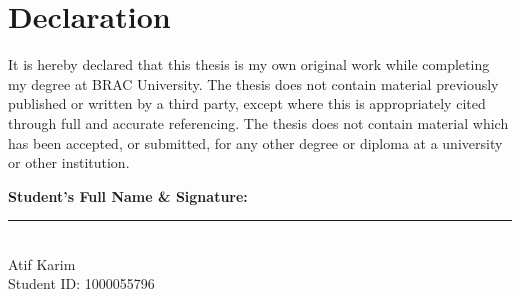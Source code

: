 \chapter*{Declaration}

It is hereby declared that this thesis is my own original work while
completing my degree at BRAC University. The thesis does not contain
material previously published or written by a third party, except where
this is appropriately cited through full and accurate referencing. The
thesis does not contain material which has been accepted, or submitted,
for any other degree or diploma at a university or other institution.

\vspace{2cm}
\noindent\textbf{Student's Full Name \& Signature:}

\vspace{1.5cm}
\noindent\rule{6cm}{0.4pt}\\
Atif Karim\\
Student ID: 1000055796
